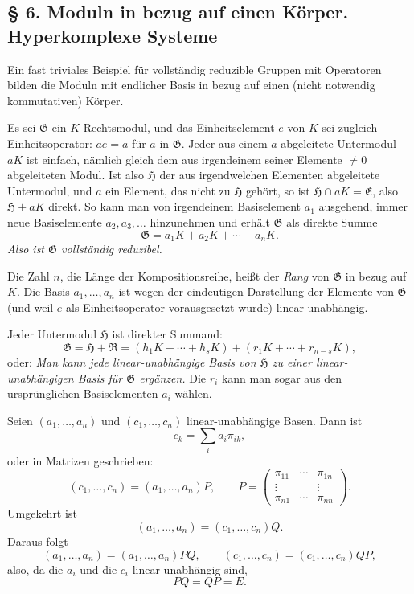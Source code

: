 \documentclass[11pt]{article}
\providecommand{\mG}{\mathfrak{G}}
\providecommand{\mE}{\mathfrak{E}}
\providecommand{\mH}{\mathfrak{H}}
\providecommand{\mR}{\mathfrak{R}}
\begin{document}
\subsection*{§ 6. Moduln in bezug auf einen Körper. Hyperkomplexe Systeme}

Ein fast triviales Beispiel für vollständig reduzible Gruppen mit Operatoren bilden die Moduln mit endlicher Basis in bezug auf einen (nicht notwendig kommutativen) Körper.

Es sei $\mG$ ein $K$-Rechtsmodul, und das Einheitselement $e$ von $K$ sei zugleich Einheitsoperator: $ae=a$ für $a$ in $\mG$. Jeder aus einem $a$ abgeleitete Untermodul $aK$ ist einfach, nämlich gleich dem aus irgendeinem seiner Elemente $\ne0$ abgeleiteten Modul. Ist also $\mH$ der aus irgendwelchen Elementen abgeleitete Untermodul, und $a$ ein Element, das nicht zu $\mH$ gehört, so ist $\mH\cap aK=\mE$, also $\mH+aK$ direkt. So kann man von irgendeinem Basiselement $a_1$ ausgehend, immer neue Basiselemente $a_2,a_3,\ldots$ hinzunehmen und erhält $\mG$ als direkte Summe
\[
        \mG=a_1K+a_2K+\cdots+a_nK.
\]
\emph{Also ist $\mG$ vollständig reduzibel.}

Die Zahl $n$, die Länge der Kompositionsreihe, heißt der \emph{Rang} von $\mG$ in bezug auf $K$. Die Basis $a_1,\ldots,a_n$ ist wegen der eindeutigen Darstellung der Elemente von $\mG$ (und weil $e$ als Einheitsoperator vorausgesetzt wurde) linear-unabhängig.

Jeder Untermodul $\mH$ ist direkter Summand:
\[
        \mG=\mH+\mR=(h_1K+\cdots+h_sK)+(r_1K+\cdots+r_{n-s}K),
\]
oder: \emph{Man kann jede linear-unabhängige Basis von $\mH$ zu einer linear-unabhängigen Basis für $\mG$ ergänzen.} Die $r_i$ kann man sogar aus den ursprünglichen Basiselementen $a_i$ wählen.

Seien $(a_1,\ldots,a_n)$ und $(c_1,\ldots,c_n)$ linear-unabhängige Basen. Dann ist
\[
        c_k=\sum_i a_i\pi_{ik},
\]
oder in Matrizen geschrieben:
\[
        (c_1,\ldots,c_n)=(a_1,\ldots,a_n)P,
        \qquad
        P=\begin{pmatrix}
        \pi_{11}&\cdots&\pi_{1n}\\
        \vdots&&\vdots\\
        \pi_{n1}&\cdots&\pi_{nn}
        \end{pmatrix}.
\]
Umgekehrt ist
\[
        (a_1,\ldots,a_n)=(c_1,\ldots,c_n)Q.
\]
Daraus folgt
\[
        (a_1,\ldots,a_n)=(a_1,\ldots,a_n)PQ,
        \qquad
        (c_1,\ldots,c_n)=(c_1,\ldots,c_n)QP,
\]
also, da die $a_i$ und die $c_i$ linear-unabhängig sind,
\[
        PQ=QP=E.
\]
\end{document}
